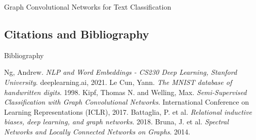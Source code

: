 \documentclass{beamer}
\begin{document}
\begin{darkframes}
    \begin{frame}[label=lists]{\large{Graph Convolutional Networks for Text Classification}}
        \framesubtitle{}
        
    \end{frame}


    \subsection{Citations and Bibliography}
    
    \begin{frame}[label=bibliography]{Bibliography}
      \begin{thebibliography}{9}
        \scriptsize{
            Ng, Andrew.
            \emph{NLP and Word Embeddings - CS230 Deep Learning, Stanford University}.
            deeplearning.ai, 2021.
            Le Cun, Yann.
            \emph{The MNIST database of handwritten digits}.
            1998.
            Kipf, Thomas N. and Welling, Max.
            \emph{Semi-Supervised Classification with Graph Convolutional Networks}.
            International Conference on Learning Representations (ICLR), 2017.
            Battaglia, P. et al.
            \emph{Relational inductive biases, deep learning, and graph networks}. 2018.
            Bruna, J. et al.
            \emph{Spectral Networks and Locally Connected Networks on Graphs}. 2014.
        }
        
        
      \end{thebibliography}
    \end{frame}
\end{darkframes}
\end{document}
